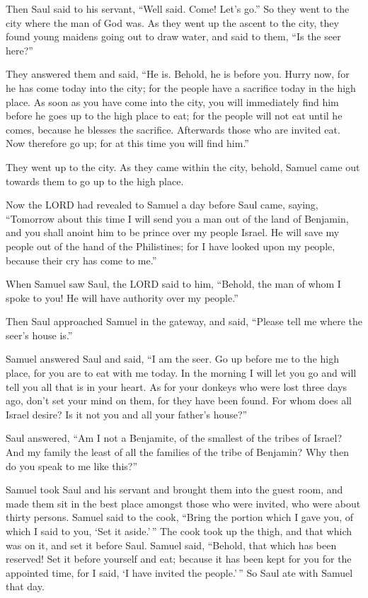  Then Saul said to his servant, ``Well said. Come! Let's
go.'' So they went to the city where the man of God was. 
As they went up the ascent to the city, they found young maidens going
out to draw water, and said to them, ``Is the seer here?''

 They answered them and said, ``He is. Behold, he is
before you. Hurry now, for he has come today into the city; for the
people have a sacrifice today in the high place.  As soon
as you have come into the city, you will immediately find him before he
goes up to the high place to eat; for the people will not eat until he
comes, because he blesses the sacrifice. Afterwards those who are
invited eat. Now therefore go up; for at this time you will find him.''

 They went up to the city. As they came within the city,
behold, Samuel came out towards them to go up to the high place.

 Now the LORD had revealed to Samuel a day before Saul
came, saying,  ``Tomorrow about this time I will send you
a man out of the land of Benjamin, and you shall anoint him to be prince
over my people Israel. He will save my people out of the hand of the
Philistines; for I have looked upon my people, because their cry has
come to me.''

 When Samuel saw Saul, the LORD said to him, ``Behold,
the man of whom I spoke to you! He will have authority over my people.''

 Then Saul approached Samuel in the gateway, and said,
``Please tell me where the seer's house is.''

 Samuel answered Saul and said, ``I am the seer. Go up
before me to the high place, for you are to eat with me today. In the
morning I will let you go and will tell you all that is in your heart.
 As for your donkeys who were lost three days ago, don't
set your mind on them, for they have been found. For whom does all
Israel desire? Is it not you and all your father's house?''

 Saul answered, ``Am I not a Benjamite, of the smallest
of the tribes of Israel? And my family the least of all the families of
the tribe of Benjamin? Why then do you speak to me like this?''

 Samuel took Saul and his servant and brought them into
the guest room, and made them sit in the best place amongst those who
were invited, who were about thirty persons.  Samuel said
to the cook, ``Bring the portion which I gave you, of which I said to
you, `Set it aside.'\,''  The cook took up the thigh, and
that which was on it, and set it before Saul. Samuel said, ``Behold,
that which has been reserved! Set it before yourself and eat; because it
has been kept for you for the appointed time, for I said, `I have
invited the people.'\,'' So Saul ate with Samuel that day.


